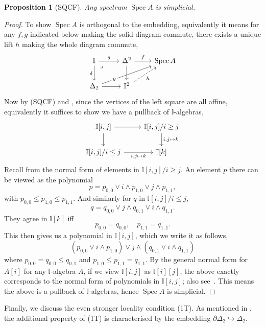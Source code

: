 \documentclass[12pt]{amsart}
\newtheorem{proposition}[theorem]{Proposition}
\theoremstyle{definition}
\newcommand{\mbb}[1]{\mathbb{#1}}
\newcommand{\I}{\mbb I}
\newcommand{\hook}{\hookrightarrow}
\newcommand{\spec}{\operatorname{Spec}}
\begin{document}
\begin{proposition}[SQCF]\label{specissimplicial}
  Any spectrum $\spec A$ is simplicial.
\end{proposition}
\begin{proof}
  To show $\spec A$ is orthogonal to the embedding, equivalently it means for any $f,g$ indicated below making the solid diagram commute, there exists a unique lift $h$ making the whole diagram commute,
  \[\begin{tikzcd}
    \I \ar[r, "\delta"] \ar[d, "\delta"'] & \Delta^2 \ar[r, "f"] \ar[d] & \spec A \\
    \Delta_2 \ar[urr, "g"{description, near start}] \ar[r] & \I^2 \ar[ur, dashed, "h"']
    \arrow["\lrcorner"{anchor=center, pos=0.125}, draw=none, from=1-1, to=2-2]
  \end{tikzcd}\]
  Now by (SQCF) and , since the vertices of the left square are all affine, equivalently it suffices to show we have a pullback of $\I$-algebras,
  \[\begin{tikzcd}
    {\I[i,j]} \ar[r] \ar[d] & {\I[i,j]/i \ge j} \ar[d, "{i,j \mapsto k}"] \\
    {\I[i,j]/i \le j} \ar[r, "{i,j\mapsto k}"'] & {\I[k]}
  \end{tikzcd}\]
  Recall from  the normal form of elements in $\I[i,j]/i\ge j$. An element $p$ there can be viewed as the polynomial 
  \[ p = p_{0,0} \vee i \wedge p_{1,0} \vee j \wedge p_{1,1}, \]
  with $p_{0,0} \le p_{1,0} \le p_{1,1}$. And similarly for $q$ in $\I[i,j]/i \le j$, 
  \[ q = q_{0,0} \vee j \wedge q_{0,1} \vee i \wedge q_{1,1}. \]
  They agree in $\I[k]$ iff 
  \[ p_{0,0} = q_{0,0}, \quad p_{1,1} = q_{1,1}. \]
  This then gives us a polynomial in $\I[i,j]$, which we write it as follows,
  \[ (p_{0,0} \vee i \wedge p_{1,0}) \vee j \wedge (q_{0,1} \vee i \wedge q_{1,1}) \]
  where $p_{0,0} = q_{0,0} \le q_{0,1}$ and $p_{1,0} \le p_{1,1} = q_{1,1}$. 
  By the general normal form for $A[i]$ for any $\I$-algebra $A$, if we view $\I[i,j]$ as $\I[i][j]$, the above exactly corresponds to the normal form of polynomials in $\I[i,j]$; also see~\cite[Thm. 10.21]{lausch2000algebra}. This means the above is a pullback of $\I$-algebras, hence $\spec A$ is simplicial.
\end{proof}



Finally, we discuss the even stronger locality condition (1T). As mentioned in , the additional property of (1T) is characterised by the embedding $\partial\Delta_2 \hook \Delta_2$.
\end{document}
